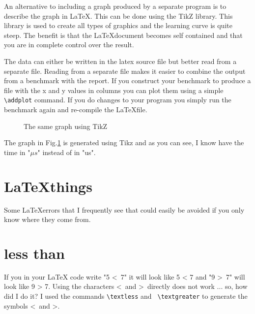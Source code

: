\documentclass[a4paper,11pt]{article}
\begin{document}
An alternative to including a graph produced by a separate program is
to describe the graph in \LaTeX. This can be done using the TikZ
library. This library is used to create all types of graphics and the
learning curve is quite steep. The benefit is that the \LaTeX document
becomes self contained and that you are in complete control over the result.

The data can either be written in the latex source file but better read
from a separate file. Reading from a separate file makes it easier to
combine the output from a benchmark with the report. If you construct
your benchmark to produce a file with the x and y values in columns
you can plot them using a simple {\tt \textbackslash addplot}
command. If you do changes to your program you simply run the
benchmark again and re-compile the \LaTeX file.

\begin{figure}
  \centering
  \caption{The same graph using TikZ}
  \label{fig:tikz}
\end{figure}

The graph in Fig.\ref{fig:tikz} is generated using Tikz and as you can
see, I know have the time in "$\mu s$" instead of in "us".


\section*{\LaTeX things}

Some \LaTeX errors that I frequently see that could easily be avoided
if you only know where they come from.

\section*{less than}

If you in your LaTeX code write "5 \textless\ 7" it will look like 5 <
7 and "9 \textgreater\ 7" will look like 9 > 7. Using the characters
\textless\ and \textgreater\ directly does not work ... so, how did I
do it?  I used the commands {\tt  \textbackslash textless} and {\tt
  \textbackslash textgreater} to generate the symbols \textless\ and
\textgreater.
\end{document}
